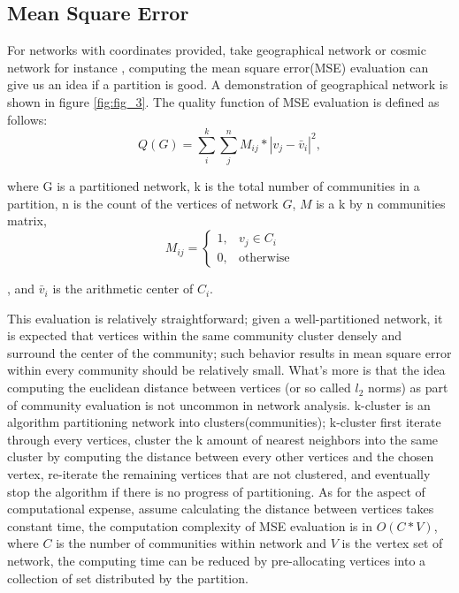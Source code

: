 \documentclass[12pt]{article}
\begin{document}
\subsection{Mean Square Error}
For networks with coordinates provided, take geographical network or cosmic network for instance \cite{9,10}, computing the mean square error(MSE) evaluation can give us an idea if a partition is good. A demonstration of geographical network is shown in figure \ref{fig:fig_3}. The quality function of MSE evaluation is defined as follows:
\begin{equation}\label{MSE1}
	Q(G) = \sum_{i}^{k}\sum_{j}^{n} M_{i j} * |v_{j} - \bar{v}_{i}|^{2},
\end{equation}
   
where G is a partitioned network, k is the total number of communities in a partition, n is the count of the vertices of network $G$, $M$ is a k by n communities matrix, 
\[
      M_{ij} = 
      \begin{cases}
        1, &  v_{j} \in C_i\\
        0, & \text{otherwise}
      \end{cases}
\]

, and $\bar{v}_{i}$ is the arithmetic center of $C_i$. 

\bigbreak

This evaluation is relatively straightforward; given a well-partitioned network, it is expected that vertices within the same community cluster densely and surround the center of the community; such behavior results in mean square error within every community should be relatively small. What's more is that the idea computing the euclidean distance between vertices (or so called $l_2$ norms)  as part of community evaluation is not uncommon in network analysis. k-cluster is an algorithm partitioning network into clusters(communities); k-cluster first iterate through every vertices,  cluster the k amount of nearest neighbors into the same cluster by computing the distance between every other vertices and the chosen vertex, re-iterate the remaining vertices that are not clustered, and eventually stop the algorithm if there is no progress of partitioning. As for the aspect of computational expense, assume calculating the distance between vertices takes constant time, the computation complexity of MSE evaluation is in $O(C*V)$, where $C$ is the number of communities within network and $V$ is the vertex set of network, the computing time can be reduced by pre-allocating vertices into a collection of set distributed by the partition.
\end{document}
